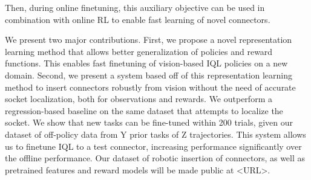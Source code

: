 Then, during online finetuning, this auxiliary objective can be used in combination with online RL to enable fast learning of novel connectors.


We present two major contributions.
First, we propose a novel representation learning method that allows better generalization of policies and reward functions.
This enables fast finetuning of vision-based IQL policies on a new domain. 
Second, we present a system based off of this representation learning method to insert connectors robustly from vision without the need of accurate socket localization,
both for observations and rewards. We outperform a regression-based baseline on the same dataset that attempts to localize the socket.
We show that new tasks can be fine-tuned within 200 trials, given our dataset of off-policy data from Y prior tasks of Z trajectories.
This system allows us to finetune IQL to a test connector, increasing performance significantly over the offline performance.
Our dataset of robotic insertion of \numconnectors{} connectors, as well as pretrained features and reward models will be made public at <URL>.




